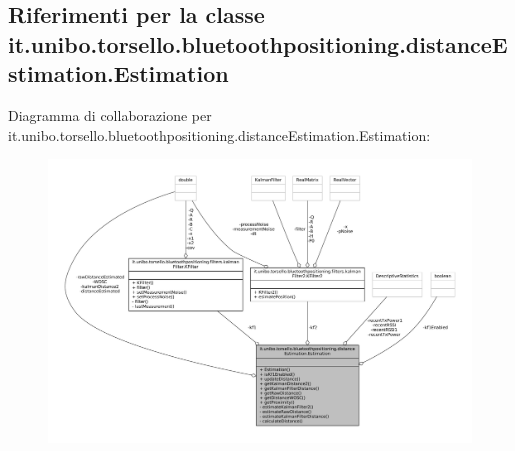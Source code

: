\hypertarget{classit_1_1unibo_1_1torsello_1_1bluetoothpositioning_1_1distanceEstimation_1_1Estimation}{}\subsection{Riferimenti per la classe it.\+unibo.\+torsello.\+bluetoothpositioning.\+distance\+Estimation.\+Estimation}
\label{classit_1_1unibo_1_1torsello_1_1bluetoothpositioning_1_1distanceEstimation_1_1Estimation}


Diagramma di collaborazione per it.\+unibo.\+torsello.\+bluetoothpositioning.\+distance\+Estimation.\+Estimation\+:
\nopagebreak
\begin{figure}[H]
\begin{center}
\leavevmode
\includegraphics[width=350pt]{classit_1_1unibo_1_1torsello_1_1bluetoothpositioning_1_1distanceEstimation_1_1Estimation__coll__graph}
\end{center}
\end{figure}
